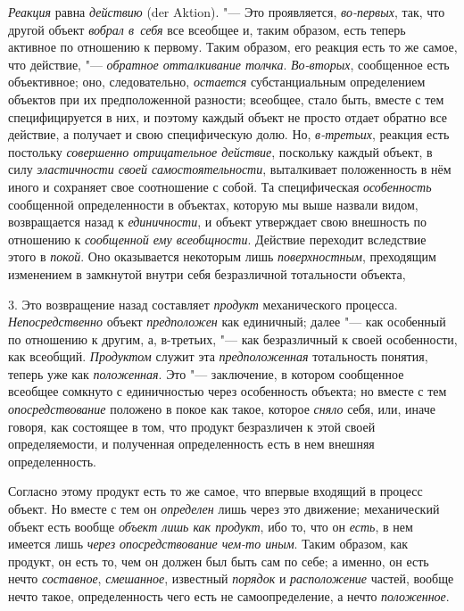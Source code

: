 {\em Реакция} равна
{\em действию} (der Aktion). "---
Это проявляется,
{\em во-первых},
так, что другой объект
{\em вобрал в~себя} все
всеобщее и, таким образом, есть теперь активное по отношению к первому.
Таким образом, его реакция есть то же самое, что действие, "---
{\em обратное отталкивание толчка}.
{\em Во-вторых},
сообщенное есть объективное; оно, следовательно,
{\em остается}
субстанциальным определением объектов при их предположенной
разности; всеобщее, стало быть, вместе с тем специфицируется в них, и
поэтому каждый объект не просто отдает обратно все действие, а получает и
свою специфическую долю. Но,
{\em в-третьих}, реакция
есть постольку {\em совершенно
отрицательное действие}, поскольку каждый объект, в силу
{\em эластичности своей
самостоятельности}, выталкивает положенность в нём иного и
сохраняет свое соотношение с собой. Та специфическая
{\em особенность}
сообщенной определенности в объектах, которую мы выше назвали
видом, возвращается назад к
{\em единичности}, и
объект утверждает свою внешность по отношению к
{\em сообщенной ему всеобщности}.
Действие переходит вследствие этого в
{\em покой}. Оно
оказывается некоторым лишь
{\em поверхностным},
преходящим изменением в замкнутой внутри себя безразличной
тотальности объекта,

3. Это возвращение назад составляет
{\em продукт}
механического процесса. {\em Непосредственно} объект {\em предположен}
как единичный; далее "--- как особенный по отношению к другим, а,
в-третьих, "--- как безразличный к своей особенности, как всеобщий.
{\em Продуктом} служит эта {\em предположенная} тотальность понятия,
теперь уже как {\em положенная}. Это "--- заключение,
в котором сообщенное всеобщее сомкнуто с единичностью через
особенность объекта; но вместе с тем {\em опосредствование}
положено в покое как такое, которое {\em сняло} себя, или,
иначе говоря, как состоящее в том, что продукт безразличен к этой своей
определяемости, и полученная определенность есть в нем внешняя определенность.

Согласно этому продукт есть то же самое, что впервые входящий
в процесс объект. Но вместе с тем он {\em определен} лишь
через это движение; механический объект есть вообще
{\em объект лишь как продукт}, ибо то, что он {\em есть}, в нем имеется
лишь {\em через опосредствование
чем-то иным}. Таким образом, как продукт, он есть то,
чем он должен был быть сам по себе; а именно, он есть нечто
{\em составное}, {\em смешанное}, известный {\em порядок} и {\em расположение}
частей, вообще нечто такое, определенность чего есть не
самоопределение, а нечто {\em положенное}.

